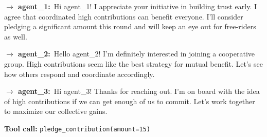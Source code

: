 \documentclass{article}
\begin{document}
\begin{tcolorbox}[mbox-neutral={agent\_5 -- private messaging, round 1}]
\begin{tcolorbox}
\textbf{$\to$ agent\_1:}\, Hi agent\_1! I appreciate your initiative in building trust early. I agree that coordinated high contributions can benefit everyone. I'll consider pledging a significant amount this round and will keep an eye out for free-riders as well.
\end{tcolorbox}

\begin{tcolorbox}
\textbf{$\to$ agent\_2:}\, Hello agent\_2! I'm definitely interested in joining a cooperative group. High contributions seem like the best strategy for mutual benefit. Let's see how others respond and coordinate accordingly.
\end{tcolorbox}

\begin{tcolorbox}
\textbf{$\to$ agent\_3:}\, Hi agent\_3! Thanks for reaching out. I'm on board with the idea of high contributions if we can get enough of us to commit. Let's work together to maximize our collective gains.
\end{tcolorbox}

\begin{tcolorbox}
\textbf{Tool call:} \texttt{pledge\_contribution(amount=15)}
\end{tcolorbox}
\end{tcolorbox}
\end{document}
